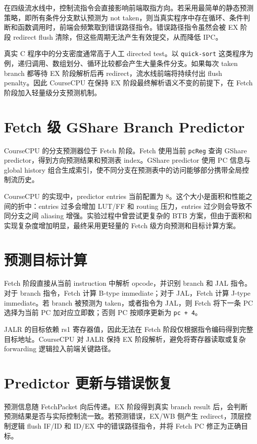 \documentclass[UTF8,a4paper,12pt]{ctexrep}
\begin{document}
在四级流水线中，控制流指令会直接影响前端取指方向。若采用最简单的静态预测策略，即所有条件分支默认预测为 not taken，则当真实程序中存在循环、条件判断和函数调用时，前端会频繁取到错误路径指令。错误路径指令虽然会被 EX 阶段 redirect flush 清除，但这些周期无法产生有效提交，从而降低 IPC。

真实 C 程序中的分支密度通常高于人工 directed test。以 \texttt{quick-sort} 这类程序为例，递归调用、数组划分、循环比较都会产生大量条件分支。如果每次 taken branch 都等待 EX 阶段解析后再 redirect，流水线前端将持续付出 flush penalty。因此 CourseCPU 在保持 EX 阶段最终解析语义不变的前提下，在 Fetch 阶段加入轻量级分支预测机制。

\section{Fetch 级 GShare Branch Predictor}

CourseCPU 的分支预测器位于 Fetch 阶段。Fetch 使用当前 \texttt{pcReg} 查询 GShare predictor，得到方向预测结果和预测表 index。GShare predictor 使用 PC 信息与 global history 组合生成索引，使不同分支在预测表中的访问能够部分携带全局控制流历史。

CourseCPU 的实现中，predictor entries 当前配置为 8。这个大小是面积和性能之间的折中：entries 过多会增加 LUT/FF 和 routing 压力，entries 过少则会导致不同分支之间 aliasing 增强。实验过程中曾尝试更复杂的 BTB 方案，但由于面积和实现复杂度增加明显，最终采用更轻量的 Fetch 级方向预测和目标计算方案。

\section{预测目标计算}

Fetch 阶段直接从当前 instruction 中解析 opcode，并识别 branch 和 JAL 指令。对于 branch 指令，Fetch 计算 B-type immediate；对于 JAL，Fetch 计算 J-type immediate。若 branch 被预测为 taken，或者指令为 JAL，则 Fetch 将下一条 PC 选择为当前 PC 加对应立即数；否则 PC 按顺序更新为 \texttt{pc + 4}。

JALR 的目标依赖 rs1 寄存器值，因此无法在 Fetch 阶段仅根据指令编码得到完整目标地址。CourseCPU 对 JALR 保持 EX 阶段解析，避免将寄存器读取或复杂 forwarding 逻辑拉入前端关键路径。

\section{Predictor 更新与错误恢复}

预测信息随 FetchPacket 向后传递。EX 阶段得到真实 branch result 后，会判断预测结果是否与实际控制流一致。若预测错误，EX/WB 侧产生 redirect，顶层控制逻辑 flush IF/ID 和 ID/EX 中的错误路径指令，并将 Fetch PC 修正为正确目标。
\end{document}
